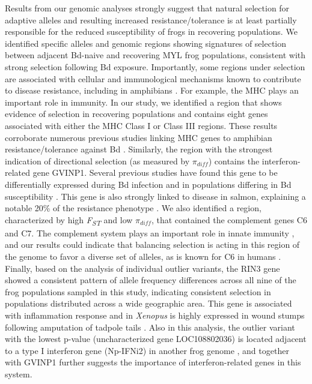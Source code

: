 \documentclass[9pt,twocolumn,twoside,lineno]{pnas-new}
\begin{document}
Results from our genomic analyses strongly suggest that natural
selection for adaptive alleles and resulting increased
resistance/tolerance is at least partially responsible for the reduced
susceptibility of frogs in recovering populations. We identified
specific alleles and genomic regions showing signatures of selection
between adjacent Bd-naive and recovering MYL frog populations,
consistent with strong selection following Bd exposure. Importantly,
some regions under selection are associated with cellular and
immunological mechanisms known to contribute to disease resistance,
including in amphibians \citep{zamudio2020}. For example, the MHC plays
an important role in immunity. In our study, we identified a region that
shows evidence of selection in recovering populations and contains eight
genes associated with either the MHC Class I or Class III regions. These
results corroborate numerous previous studies linking MHC genes to
amphibian resistance/tolerance against Bd
\citep[e.g.,][]{savage2011, bataille2015}. Similarly, the region with
the strongest indication of directional selection (as measured by
\(\pi_{diff}\)) contains the interferon-related gene GVINP1. Several
previous studies have found this gene to be differentially expressed
during Bd infection \citep[e.g.,][]{grogan2018, ellison2014} and in
populations differing in Bd susceptibility \citep{grogan2018}. This gene
is also strongly linked to disease in salmon, explaining a notable 20\%
of the resistance phenotype \citep{robledo2020, robledo2018}. We also
identified a region, characterized by high \emph{F\textsubscript{ST}}
and low \(\pi_{diff}\), that contained the complement genes C6 and C7.
The complement system plays an important role in innate immunity
\citep{rieraromo2016}, and our results could indicate that balancing
selection is acting in this region of the genome to favor a diverse set
of alleles, as is known for C6 in humans \citep{soejima2005}. Finally,
based on the analysis of individual outlier variants, the RIN3 gene
showed a consistent pattern of allele frequency differences across all
nine of the frog populations sampled in this study, indicating
consistent selection in populations distributed across a wide geographic
area. This gene is associated with inflammation response and in
\emph{Xenopus} is highly expressed in wound stumps following amputation
of tadpole tails \citep{fukazawa2009}. Also in this analysis, the
outlier variant with the lowest p-value (uncharacterized gene
LOC108802036) is located adjacent to a type I interferon gene (Np-IFNi2)
in another frog genome \citep{gan2018}, and together with GVINP1 further
suggests the importance of interferon-related genes in this system.
\end{document}
